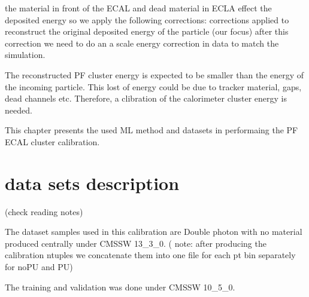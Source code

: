 the material in front of the ECAL and dead material in ECLA effect the deposited energy so we apply the following corrections:
corrections applied to reconstruct the original deposited energy of the particle (our focus)
after this correction we need to do an a scale energy correction in data to match the simulation.



The reconstructed PF cluster energy is expected to be smaller than the energy of the incoming particle.
This lost of energy could be due to tracker material, gaps, dead channels etc. Therefore, a clibration of the calorimeter cluster energy is needed. 


This chapter presents the used ML method and datasets in performaing the PF ECAL cluster calibration.  

\section{data sets description}
(check reading notes)




The dataset samples used in this calibration are Double photon with no material produced centrally under CMSSW 13_3_0.
( note: after producing	the calibration	ntuples	we concatenate them into one file for each pt bin separately for noPU and PU) 

The training and validation was done under CMSSW 10_5_0.

